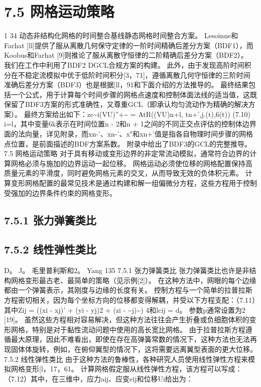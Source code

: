 \documentclass[UTF8,11pt,a4paper,openany,fontset=fandol]{ctexbook}
\begin{document}
\section{7.5 网格运动策略}
1 34 动态非结构化网格的时间整合基线静态网格时间整合方案。 Lesoinne和Farhat [ll]提供了服从离散几何保守定律的一阶时间精确后差分方案（BDF1），而Koobus和Farhat [9]则推论了服从离散守恒律的二阶精确后差分方案（BDF2）。 我们在工作中利用了BDF2 DGCL合规方案的构建。 此外，由于发现高阶时间积分在不稳定流模拟中优于低阶时间积分[3，71]，遵循离散几何守恒律的三阶时间准确后差分方案（BDF3）也是根据[ll，91和下面介绍的方法推导的。 最终结果包括一个公式，用于计算每个时间步骤的网格点速度和控制体面法线的适当值，这既保留了BDF3方案的形式准确性，又尊重GCL（即承认均匀流动作为精确的解决方案）。 最终方案给出如下：zc\textasciitilde{}i(VU)”+\textasciitilde{} = AtR((VU)n+l, tn+',j.(t),6(t)) (7.10) i=l，其中变量6k表示在时间位置n - 2和n + 1之间的不同正交点评估的控制体边界面的法向量，详见附录，而xn-'、xn-'、x"和xn+'值是指各自物理时间步骤的网格点位置，是前面描述的BDF方案系数。 附录中给出了BDF3的GCL的完整推导。 7.5 网格运动策略 对于具有移动或变形边界的非定常流动模拟，通常符合边界的计算网格必须与施加的边界运动一起位移。 网格运动必须使位移的网格配置保持高质量元素的平滑度，同时避免网格元素的交叉，从而导致无效的负体积元素。 计算变形网格配置的最常见技术是通过构建和解一组偏微分方程，这些方程用于控制受强加的边界条件约束的网格变形。

\subsection{7.5.1 张力弹簧类比}
\subsection{7.5.2 线性弹性类比}
D。 J。 毛里普利斯和2。 Yang 135 7.5.1 张力弹簧类比 张力弹簧类比也许是非结构网格变形最古老、最简单的策略（见示例[2]）。 在这种方法中，网眼的每个边缘都由一个弹簧表示，其刚度与边缘的长度有关。 控制方程与一个简单的拉普拉斯方程密切相关，因为每个坐标方向的位移都变得解耦，并受以下方程支配：（7.11）其中Zij = ((xi - xj)' + (yi - yj)2 + (zi - \textasciitilde{}j)\textasciitilde{}) 4和lcij = d。 参数p通常设置为2 [19]。 虽然这些方程相对容易解决，但这种方法往往会产生折叠或负细胞体积的变形网格，特别是对于黏性流动问题中使用的高长宽比网格。 由于拉普拉斯方程遵循最大原理，因此不难看出，即使在存在高弹簧常数的情况下，这种方法也无法再现固体体旋转，例如，在俯仰翼型的情况下，这将需要远离翼型表面的更大位移。 7.5.2 线性弹性类比 由于这种方法的鲁棒性，各种研究人员使用线性弹性方程来模拟网格变形[l，17，61。 计算网格假定服从线性弹性方程，该方程可以写成：（7.12）其中，在三维中，应力aij、应变eij和位移Ui给出为：
\end{document}
